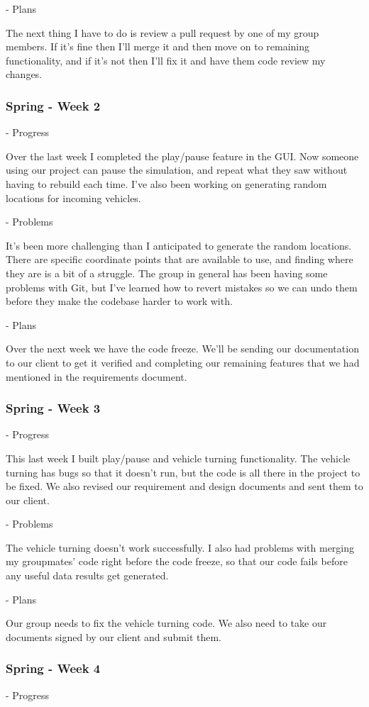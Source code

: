 \documentclass[onecolumn, draftclsnofoot,10pt, compsoc]{IEEEtran}
\begin{document}
- Plans

The next thing I have to do is review a pull request by one of my group members.
If it's fine then I'll merge it and then move on to remaining functionality, and if it's not then I'll fix it and have them code review my changes.
\subsubsection{Spring - Week 2}
- Progress

Over the last week I completed the play/pause feature in the GUI.
Now someone using our project can pause the simulation, and repeat what they saw without having to rebuild each time.
I've also been working on generating random locations for incoming vehicles.

- Problems

It's been more challenging than I anticipated to generate the random locations.
There are specific coordinate points that are available to use, and finding where they are is a bit of a struggle.
The group in general has been having some problems with Git, but I've learned how to revert mistakes so we can undo them before they make the codebase harder to work with.

- Plans

Over the next week we have the code freeze.
We'll be sending our documentation to our client to get it verified and completing our remaining features that we had mentioned in the requirements document.
\subsubsection{Spring - Week 3}
- Progress

This last week I built play/pause and vehicle turning functionality.
The vehicle turning has bugs so that it doesn't run, but the code is all there in the project to be fixed.
We also revised our requirement and design documents and sent them to our client.

- Problems

The vehicle turning doesn't work successfully.
I also had problems with merging my groupmates' code right before the code freeze, so that our code fails before any useful data results get generated.

- Plans

Our group needs to fix the vehicle turning code.
We also need to take our documents signed by our client and submit them.
\subsubsection{Spring - Week 4}
- Progress
\end{document}
